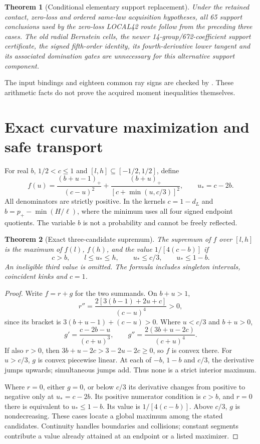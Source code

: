 \documentclass[11pt]{article}
\newtheorem{theorem}{Theorem}
\newcommand{\pos}[1]{(#1)_+}
\begin{document}
\begin{theorem}[Conditional elementary support replacement]
Under the retained contact, zero-loss and ordered same-law acquisition
hypotheses, all 65 support conclusions used by the zero-loss LOCAL42 route
follow from the preceding three cases. The old radial Bernstein cells,
the newer 14-group/672-coefficient support certificate, the signed
fifth-order identity, its fourth-derivative lower tangent and its associated
domination gates are unnecessary for this alternative support component.
\end{theorem}
The input bindings and eighteen common ray signs are checked by
. These arithmetic facts do not prove
the acquired moment inequalities themselves.

\section{Exact curvature maximization and safe transport}
For real $b$, $1/2<c\le1$ and $[l,h]\subseteq[-1/2,1/2]$, define
\[
 f(u)=\frac{\pos{b+u-1}}{(c-u)^2}
       +\frac{\pos{b+u}}{[c+\min(u,c/3)]^2},\qquad u_*=c-2b.
\]
All denominators are strictly positive. In the kernels $c=1-d_L$ and
$b=p_+-\min(H/\ell)$, where the minimum uses all four signed endpoint
quotients. The variable $b$ is not a probability and cannot be freely
reflected.

\begin{theorem}[Exact three-candidate supremum]
The supremum of $f$ over $[l,h]$ is the maximum of $f(l)$, $f(h)$, and
the value $1/[4(c-b)]$ if
\[
 c>b,\qquad l\le u_*\le h,\qquad
 u_*\le c/3,\qquad u_*\le1-b.
\]
An ineligible third value is omitted. The formula includes singleton
intervals, coincident kinks and $c=1$.
\end{theorem}
\begin{proof}
Write $f=r+g$ for the two summands. On $b+u>1$,
\[
 r''=\frac{2[3(b-1)+2u+c]}{(c-u)^4}>0,
\]
since its bracket is $3(b+u-1)+(c-u)>0$. Where $u<c/3$ and $b+u>0$,
\[
 g'=\frac{c-2b-u}{(c+u)^3},\qquad
 g''=\frac{2(3b+u-2c)}{(c+u)^4}.
\]
If also $r>0$, then $3b+u-2c>3-2u-2c\ge0$, so $f$ is convex there.
For $u>c/3$, $g$ is convex piecewise linear. At each of
$-b$, $1-b$ and $c/3$, the derivative jumps upwards; simultaneous jumps
add. Thus none is a strict interior maximum.

Where $r=0$, either $g=0$, or below $c/3$ its derivative changes from
positive to negative only at $u_*=c-2b$. Its positive numerator condition
is $c>b$, and $r=0$ there is equivalent to $u_*\le1-b$.
Its value is $1/[4(c-b)]$. Above $c/3$, $g$ is nondecreasing.
These cases locate a global maximum among the stated candidates.
Continuity handles boundaries and collisions; constant segments contribute
a value already attained at an endpoint or a listed maximizer.
\end{proof}
\end{document}
